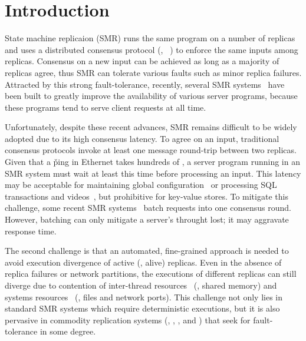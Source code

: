 \section{Introduction} \label{sec:intro}

State machine replicaion (SMR) runs the same program on a 
number of replicas and uses a distributed consensus protocol (\eg, 
\paxos~\cite{crane:sosp15}) to enforce the same inputs among 
replicas. Consensus on a new input can be achieved as long as a majority 
of replicas agree, thus SMR can tolerate various faults such as minor replica 
failures. Attracted by this strong fault-tolerance, recently, several SMR 
systems~\cite{chubby:osdi, zookeeper, crane:sosp15, eve:osdi12, rex:eurosys14} 
have been built to greatly improve the availability of various server programs, 
because these programs tend to serve client requests at all time.

Unfortunately, despite these recent advances, SMR remains difficult to be 
widely adopted due to its high consensus latency. To agree on an input, 
traditional consensus protocols invoke at least one message round-trip between 
two replicas. Given that a \v{ping} in Ethernet takes hundreds of \us, a server 
program running in an SMR system must wait at least this time before processing 
an input. This latency may be acceptable for maintaining global 
configuration~\cite{chubby:osdi,zookeeper} or processing SQL transactions and 
videos~\cite{crane:sosp15,eve:osdi12}, but prohibitive for key-value stores. To 
mitigate this challenge, some recent SMR 
systems~\cite{calvin:sigmod12,rex:eusorys14} batch requests into one 
consensus round. However, batching can only mitigate a server's throught lost; 
it may aggravate response time.

The second challenge is that an automated, fine-grained approach is needed to 
avoid execution divergence of active (\ie, alive) replicas. Even in the absence 
of replica failures or network partitions, the executions of different replicas 
can still diverge due to contention of 
inter-thread resources~\cite{coredet:asplos10} (\eg, shared memory) and systems 
resources~\cite{racepro:sosp11} (\eg, files and network ports). This challenge 
not only lies in standard SMR systems which require deterministic executions, 
but it is also pervasive in commodity replication systems (\eg, \redis, 
\memcached, and \mysql) that seek for fault-tolerance in some degree.

